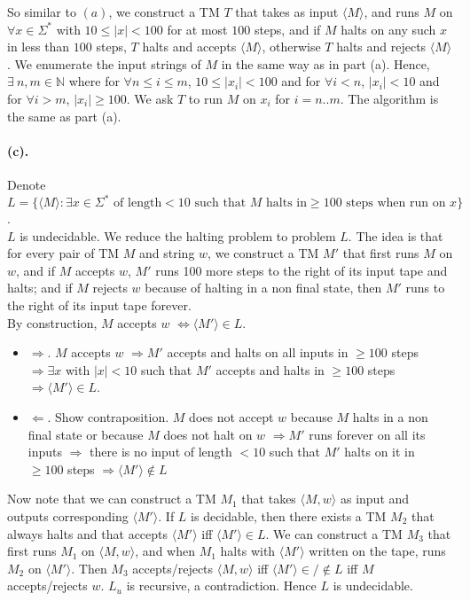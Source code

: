 \documentclass[12pt]{article}
\begin{document}
So similar to \((a)\), we construct a TM \(T\) that takes as input \(\langle M \rangle\), and runs \(M\) on \(\forall x \in \Sigma^*\) with \(10 \leq |x| < 100\) for at most \(100\) steps, and if \(M\) halts on any such \(x\) in less than \(100\) steps, \(T\) halts and accepts \(\langle M \rangle\), otherwise \(T\) halts and rejects \(\langle M \rangle\). We enumerate the input strings of \(M\) in the same way as in part (a). Hence, \(\exists\ n, m \in \mathbb{N}\) where for \(\forall n\leq i \leq m\), \(10 \leq |x_i| < 100\) and for \(\forall i < n\), \(|x_i| < 10\) and for \(\forall i > m\), \(|x_i| \geq 100\). We ask \(T\) to run \(M\) on \(x_i\) for \(i = n .. m\). The algorithm is the same as part (a).

\paragraph*{(c).} Denote \(L = \{\langle M \rangle : \exists x \in \Sigma^* \text{ of length} < 10 \text{ such that } M \text{ halts in} \geq 100 \text{ steps when run on } x\}\).\\
\(L\) is undecidable. We reduce the halting problem to problem \(L\). The idea is that for every pair of TM \(M\) and string \(w\), we construct a TM \(M'\) that first runs \(M\) on \(w\), and if \(M\) accepts \(w\), \(M'\) runs 100 more steps to the right of its input tape and halts; and if \(M\) rejects \(w\) because of halting in a non final state, then \(M'\) runs to the right of its input tape forever. \\
\noindent
By construction, \(M\) accepts \(w\) \(\Leftrightarrow \langle M'\rangle \in L\). 
\begin{itemize}
  \item \(\Rightarrow\). \(M\) accepts \(w\) \(\Rightarrow M'\) accepts and halts on all inputs in \(\geq 100\) steps \(\Rightarrow \exists x\) with \(|x| < 10\) such that \(M'\) accepts and halts in \(\geq 100\) steps \(\Rightarrow \langle M' \rangle \in L\).
  \item \(\Leftarrow\). Show contraposition. \(M\) does not accept \(w\) because \(M\) halts in a non final state or because \(M\) does not halt on \(w\) \(\Rightarrow M'\) runs forever on all its inputs  \(\Rightarrow\) there is no input of length \(< 10\) such that \(M'\) halts on it in \(\geq 100\) steps \(\Rightarrow \langle M' \rangle \notin L\)
\end{itemize}
Now note that we can construct a TM \(M_1\) that takes \(\langle M, w\rangle\) as input and outputs corresponding \(\langle M' \rangle\). If \(L\) is decidable, then there exists a TM \(M_2\) that always halts and that accepts \(\langle M'\rangle\) iff \(\langle M'\rangle \in L\). We can construct a TM \(M_3\) that first runs \(M_1\) on \(\langle M, w\rangle\), and when \(M_1\) halts with \(\langle M' \rangle\) written on the tape, runs \(M_2\) on \(\langle M' \rangle\). Then \(M_3\) accepts/rejects \(\langle M, w\rangle\) iff \(\langle M' \rangle \in/\notin L\) iff \(M\) accepts/rejects \(w\). \(L_u\) is recursive, a contradiction. Hence \(L\) is undecidable.
\end{document}

